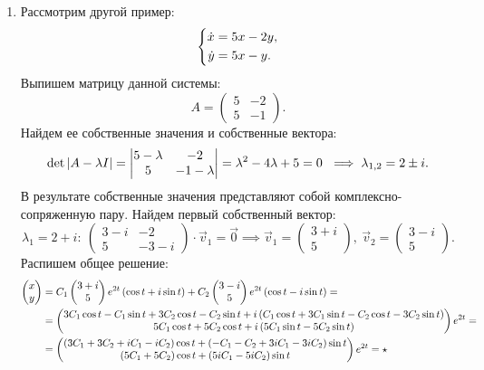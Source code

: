 \begin{enumerate}
			\item Рассмотрим другой пример:
				\[ \left\lbrace \begin{aligned} \dot{x} &= 5x - 2y,\\ \dot{y} &= 5x - y. \end{aligned} \right. \]
				Выпишем матрицу данной системы:
				\[ A = \begin{pmatrix} 5 & -2 \\ 5 & -1 \end{pmatrix}. \]
				Найдем ее собственные значения и собственные вектора:
				\[ \det\left\vert A - \lambda I \right\vert = \begin{vmatrix} 5 - \lambda & -2 \\ 5 & -1 - \lambda \end{vmatrix} = \lambda^2 - 4 \lambda + 5 = 0 ~ \implies \lambda_{1, 2} = 2 \pm i. \]
				В результате собственные значения представляют собой комплексно-сопряженную пару. Найдем первый собственный вектор:
				\[ \lambda_1 = 2 + i: ~ \begin{pmatrix} 3 - i & -2 \\ 5 & -3 - i \end{pmatrix} \cdot \vec{v}_1 = \vec{0} \implies \vec{v}_1 = \begin{pmatrix} 3 + i \\ 5 \end{pmatrix}, ~ \vec{v}_2 = \begin{pmatrix} 3 - i \\ 5 \end{pmatrix}. \]
				Распишем общее решение:
				\[ \begin{split} 
					\begin{pmatrix} x \\ y \end{pmatrix} &= C_1 \begin{pmatrix} 3 + i \\ 5 \end{pmatrix} e^{2t} \pares{\cos{t} + i \sin{t}} + C_2 \begin{pmatrix} 3 - i \\ 5 \end{pmatrix} e^{2t} \pares{\cos{t} - i \sin{t}} = \\ 
					&= \begin{pmatrix} 3C_1 \cos{t} - C_1 \sin{t} + 3C_2 \cos{t} - C_2 \sin{t} + i \pares{C_1 \cos{t} + 3 C_1 \sin{t} - C_2 \cos{t} - 3C_2 \sin{t} } \\ 5C_1 \cos{t} + 5C_2 \cos{t} + i \pares{5C_1 \sin{t} - 5C_2 \sin{t}} \end{pmatrix} e^{2t} = \\
					&= \begin{pmatrix} \pares{3C_1 + 3C_2 + iC_1 - iC_2} \cos{t} + \pares{-C_1 - C_2 + 3i C_1 - 3iC_2} \sin{t} \\ \pares{5C_1 + 5C_2} \cos{t} + \pares{5iC_1 - 5iC_2} \sin{t} \end{pmatrix} e^{2t} = \star

\end{split}\]
\end{enumerate}
